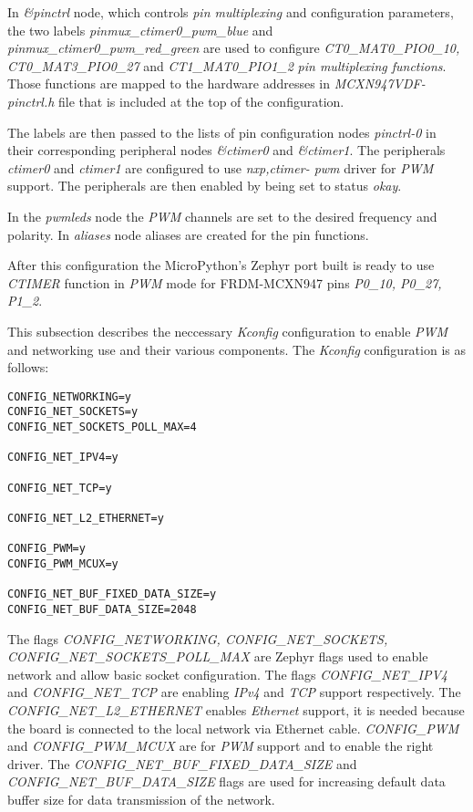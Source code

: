 \documentclass[twoside, 12pt]{article}
\begin{document}
In \textit{\&pinctrl} node, which controls \textit{pin multiplexing} and configuration 
parameters\cite{zephyr_start}, the two labels \textit{pinmux\_ctimer0\_pwm\_blue} and 
\textit{pinmux\_ctimer0\_pwm\_red\_green} are used to configure \textit{CT0\_MAT0\_PIO0\_10, 
CT0\_MAT3\_PIO0\_27} and \textit{CT1\_MAT0\_PIO1\_2} \textit{pin multiplexing functions}. 
Those functions are mapped to the hardware addresses in \textit{MCXN947VDF-pinctrl.h} file 
that is included at the top of the configuration.

The labels are then passed to the lists of pin configuration nodes \textit{pinctrl-0} in 
their corresponding peripheral nodes \textit{\&ctimer0} and \textit{\&ctimer1}. The 
peripherals \textit{ctimer0} and \textit{ctimer1} are configured to use \textit{nxp,ctimer-
pwm} driver for \textit{PWM} support. The peripherals are then enabled by being set to status \textit{okay}.

In the \textit{pwmleds} node the \textit{PWM} channels are set to the desired frequency and polarity. In \textit{aliases} node aliases are created for the pin functions.

After this configuration the MicroPython's Zephyr port built is ready to use \textit{CTIMER} function in \textit{PWM} mode for FRDM-MCXN947 pins \textit{P0\_10, P0\_27, P1\_2}.

This subsection describes the neccessary \textit{Kconfig} configuration to enable \textit{PWM} and networking use and their various components. The \textit{Kconfig} configuration is as follows:

\begin{lstlisting}[caption={Configuring PWM and networking support in MicroPython's Zephyr port with Kconfig},breaklines=true]
CONFIG_NETWORKING=y
CONFIG_NET_SOCKETS=y
CONFIG_NET_SOCKETS_POLL_MAX=4

CONFIG_NET_IPV4=y

CONFIG_NET_TCP=y

CONFIG_NET_L2_ETHERNET=y

CONFIG_PWM=y
CONFIG_PWM_MCUX=y

CONFIG_NET_BUF_FIXED_DATA_SIZE=y
CONFIG_NET_BUF_DATA_SIZE=2048 
\end{lstlisting}

The flags \textit{CONFIG\_NETWORKING, CONFIG\_NET\_SOCKETS, CONFIG\_NET\_SOCKETS\_POLL\_MAX} 
are Zephyr flags used to enable network and allow basic socket configuration. The flags 
\textit{CONFIG\_NET\_IPV4} and \textit{CONFIG\_NET\_TCP} are enabling \textit{IPv4} and 
\textit{TCP} support respectively. The \textit{CONFIG\_NET\_L2\_ETHERNET} enables 
\textit{Ethernet} support, it is needed because the board is connected to the local network
via Ethernet cable. \textit{CONFIG\_PWM} and \textit{CONFIG\_PWM\_MCUX} are for \textit{PWM}
support and to enable the right driver. The \textit{CONFIG\_NET\_BUF\_FIXED\_DATA\_SIZE} and 
\textit{CONFIG\_NET\_BUF\_DATA\_SIZE} flags are used for increasing default data buffer size for data transmission of the network. 
\end{document}
